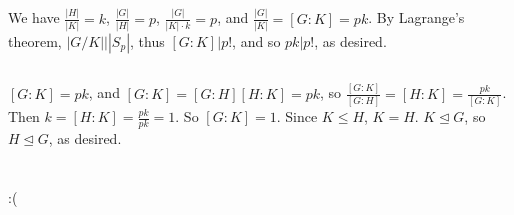 \documentclass[11pt]{article}
\begin{document}
\subsection{} %
We have $\frac{|H|}{|K|}=k$, $\frac{|G|}{|H|}=p$, $\frac{|G|}{|K|\cdot k}=p$,
and $\frac{|G|}{|K|}=[G:K]=pk$. By Lagrange's theorem, $|G/K|\big\vert|S_p|$,
thus $[G:K]\big\vert p!$, and so $pk|p!$, as desired.


\subsection{} %
$[G:K]=pk$, and $[G:K]=[G:H][H:K]=pk$, so
$\frac{[G:K]}{[G:H]}=[H:K]=\frac{pk}{[G:K]}$. Then $k=[H:K]=\frac{pk}{pk}=1$.
So $[G:K]=1$. Since $K\le H$, $K=H$. $K\trianglelefteq G$, so
$H\trianglelefteq G$, as desired.


\section{} %
\subsection{} %
:(
\end{document}
